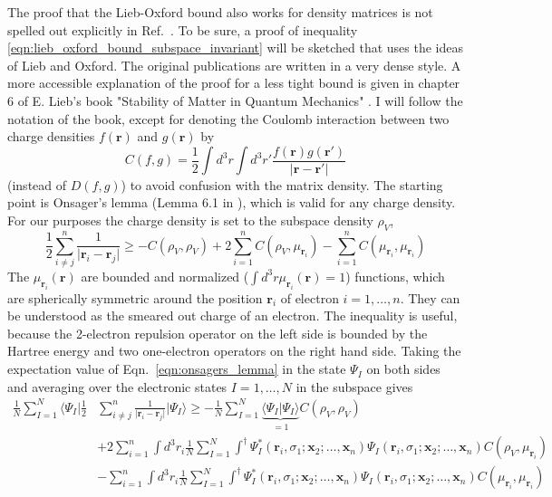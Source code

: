 \documentclass[journal=jacsat,manuscript=article]{achemso}
\renewcommand\vec[1]{\mathbf{#1}}
\begin{document}
The proof that the Lieb-Oxford bound also works for density matrices is not spelled out explicitly in Ref.~\cite{Lieb1981}. To be sure, a proof
of inequality \ref{eqn:lieb_oxford_bound_subspace_invariant} will be sketched that uses the ideas of Lieb and Oxford. The original publications
\cite{Lieb1979,Lieb1981} are written in a very dense style. A more accessible explanation of the proof
for a less tight bound is given in chapter 6 of E. Lieb's book "Stability of Matter in Quantum Mechanics" \cite{Lieb2010_Stability_of_Matter}.
I will follow the notation of the book, except for denoting the Coulomb interaction between two charge densities
$f(\vec{r})$ and $g(\vec{r})$ by 
\begin{equation}
  C(f,g) = \frac{1}{2} \int d^3r \int d^3r' \frac{f(\vec{r}) g(\vec{r}')}{\vert \vec{r} - \vec{r}' \vert}
\end{equation}
(instead of $D(f,g)$) to avoid confusion with the matrix density. The starting point is Onsager's lemma
(Lemma 6.1 in \cite{Lieb2010_Stability_of_Matter}), which is valid for any charge density. For our purposes the
charge density is set to the subspace density $\rho_V$,
\begin{equation}
\frac{1}{2} \sum_{i \neq j}^n \frac{1}{\vert \vec{r}_i - \vec{r}_j \vert}
\geq - C(\rho_V,\rho_V) + 2 \sum_{i=1}^n C(\rho_V, \mu_{\vec{r}_i}) - \sum_{i=1}^{n} C(\mu_{\vec{r}_i},\mu_{\vec{r}_i}) \label{eqn:onsagers_lemma}
\end{equation}
The $\mu_{\vec{r}_i}(\vec{r})$ are bounded and normalized ($\int d^3r \mu_{\vec{r}_i}(\vec{r}) = 1$) functions, which are
spherically symmetric around the position $\vec{r}_i$ of electron $i=1,\ldots,n$.
They can be understood as the smeared out charge of an electron. The inequality is useful, because
the 2-electron repulsion operator on the left side is bounded by the Hartree energy and two one-electron operators on the right hand side. \cite{Lieb2010_Stability_of_Matter}
Taking the expectation value of Eqn.~\ref{eqn:onsagers_lemma} in the state $\Psi_I$ on both sides and averaging over the electronic states $I=1,\ldots,N$
in the subspace gives
\begin{equation}
\begin{split}
\frac{1}{N} \sum_{I=1}^N \langle \Psi_I \vert \frac{1}{2} & \sum_{i \neq j}^n \frac{1}{\vert \vec{r}_i - \vec{r}_j \vert} \vert \Psi_I \rangle
\geq
-\frac{1}{N} \sum_{I=1}^{N} \underbrace{\langle \Psi_I \vert \Psi_I \rangle}_{=1} C(\rho_V, \rho_V) \\
& + 2 \sum_{i=1}^n \int d^3r_i 
\frac{1}{N} \sum_{I=1}^{N} \int^{\dagger} \Psi_I^*(\vec{r}_i,\sigma_1;\vec{x}_2;\ldots,\vec{x}_n)
\Psi_I(\vec{r}_i,\sigma_1;\vec{x}_2;\ldots,\vec{x}_n)
C(\rho_V,\mu_{\vec{r}_i})
\\
& - \sum_{i=1}^n \int d^3r_i
\frac{1}{N} \sum_{I=1}^{N} \int^{\dagger} \Psi_I^*(\vec{r}_i,\sigma_1;\vec{x}_2;\ldots,\vec{x}_n)
\Psi_I(\vec{r}_i,\sigma_1;\vec{x}_2;\ldots,\vec{x}_n)
C(\mu_{\vec{r}_i},\mu_{\vec{r}_i}) \label{eqn:onsagers_lemma_2}
\end{split}
\end{equation}
\end{document}

